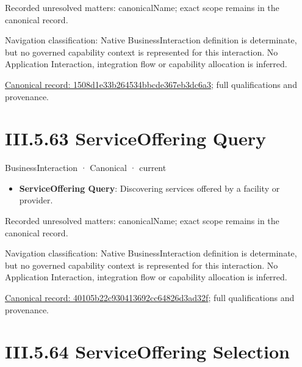 {\small Recorded unresolved matters: canonicalName; exact scope remains in the canonical record.}\par
{\small Navigation classification: Native BusinessInteraction definition is determinate, but no governed capability context is represented for this interaction. No Application Interaction, integration flow or capability allocation is inferred.}\par
{\footnotesize \href{../../../../../../../continuum/business/business-interaction/1508d1e33b264534bbcde367eb3dc6a3.md}{Canonical record: 1508d1e33b264534bbcde367eb3dc6a3}; full qualifications and provenance.}\par
\section*{III.5.63 ServiceOffering Query}
\label{navigation:III.5.63}

\label{element:40105b22c930413692cc64826d3ad32f}
{\small BusinessInteraction · Canonical · current}\par

\begin{itemize}


\item \textbf{ServiceOffering Query}: Discovering services offered by a facility or provider.

\end{itemize}

{\small Recorded unresolved matters: canonicalName; exact scope remains in the canonical record.}\par
{\small Navigation classification: Native BusinessInteraction definition is determinate, but no governed capability context is represented for this interaction. No Application Interaction, integration flow or capability allocation is inferred.}\par
{\footnotesize \href{../../../../../../../continuum/business/business-interaction/40105b22c930413692cc64826d3ad32f.md}{Canonical record: 40105b22c930413692cc64826d3ad32f}; full qualifications and provenance.}\par
\section*{III.5.64 ServiceOffering Selection}
\label{navigation:III.5.64}

